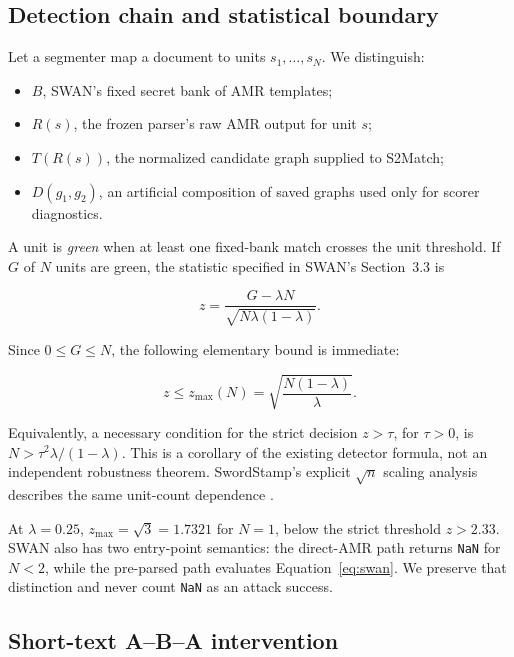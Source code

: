 \documentclass[10pt]{article}
\begin{document}
\subsection{Detection chain and statistical boundary}

Let a segmenter map a document to units $s_1,\ldots,s_N$. We distinguish:

\begin{itemize}
  \item $B$, SWAN's fixed secret bank of AMR templates;
  \item $R(s)$, the frozen parser's raw AMR output for unit $s$;
  \item $T(R(s))$, the normalized candidate graph supplied to S2Match;
  \item $D(g_1,g_2)$, an artificial composition of saved graphs used only for
  scorer diagnostics.
\end{itemize}

A unit is \emph{green} when at least one fixed-bank match crosses the unit
threshold. If $G$ of $N$ units are green, the statistic specified in SWAN's
Section~3.3 \citep{ye2026swan} is

\begin{equation}
z = \frac{G-\lambda N}{\sqrt{N\lambda(1-\lambda)}}.
\label{eq:swan}
\end{equation}

Since $0\leq G\leq N$, the following elementary bound is immediate:

\begin{equation}
z \leq z_{\max}(N) = \sqrt{\frac{N(1-\lambda)}{\lambda}}.
\end{equation}

Equivalently, a necessary condition for the strict decision $z>\tau$, for
$\tau>0$, is $N>\tau^2\lambda/(1-\lambda)$. This is a corollary of the
existing detector formula, not an independent robustness theorem.
SwordStamp's explicit $\sqrt{n}$ scaling analysis describes the same
unit-count dependence \citep{diaa2026swordstamp}.

At $\lambda=0.25$, $z_{\max}=\sqrt{3}=1.7321$ for $N=1$, below the
strict threshold $z>2.33$. SWAN also has two entry-point semantics: the
direct-AMR path returns \texttt{NaN} for $N<2$, while the pre-parsed path
evaluates Equation~\ref{eq:swan}. We preserve that distinction and never
count \texttt{NaN} as an attack success.

\subsection{Short-text A--B--A intervention}
\end{document}

